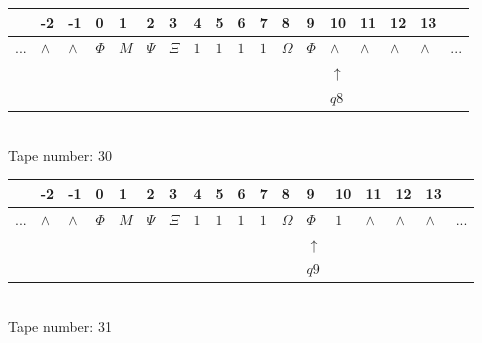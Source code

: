 \documentclass[11pt]{article}
\begin{document}
\begin{table}[H]
\centering
\begin{tabular}{llllllllllllllllll}
 & -2 & -1 & 0 & 1 & 2 & 3 & 4 & 5 & 6 & 7 & 8 & 9 & 10 & 11 & 12 & 13 & \\
\hline
$...$ & \multicolumn{1}{|l|}{$\wedge$} & \multicolumn{1}{|l|}{$\wedge$} & \multicolumn{1}{|l|}{$\Phi$} & \multicolumn{1}{|l|}{$M$} & \multicolumn{1}{|l|}{$\Psi$} & \multicolumn{1}{|l|}{$\Xi$} & \multicolumn{1}{|l|}{$1$} & \multicolumn{1}{|l|}{$1$} & \multicolumn{1}{|l|}{$1$} & \multicolumn{1}{|l|}{$1$} & \multicolumn{1}{|l|}{$\Omega$} & \multicolumn{1}{|l|}{$\Phi$} & \multicolumn{1}{|l|}{$\wedge$} & \multicolumn{1}{|l|}{$\wedge$} & \multicolumn{1}{|l|}{$\wedge$} & \multicolumn{1}{|l|}{$\wedge$} & $...$\\
\hline
&  &  &  &  &  &  &  &  &  &  &  &  & $\uparrow$ &  &  &  &  \\
&  &  &  &  &  &  &  &  &  &  &  &  & $ q8 $ &  &  &  &  \\
\end{tabular}
\\
Tape number: 30
\noindent\makebox[\linewidth]{\hdashrule{\textwidth}{1pt}{1pt}}\end{table}

\begin{table}[H]
\centering
\begin{tabular}{llllllllllllllllll}
 & -2 & -1 & 0 & 1 & 2 & 3 & 4 & 5 & 6 & 7 & 8 & 9 & 10 & 11 & 12 & 13 & \\
\hline
$...$ & \multicolumn{1}{|l|}{$\wedge$} & \multicolumn{1}{|l|}{$\wedge$} & \multicolumn{1}{|l|}{$\Phi$} & \multicolumn{1}{|l|}{$M$} & \multicolumn{1}{|l|}{$\Psi$} & \multicolumn{1}{|l|}{$\Xi$} & \multicolumn{1}{|l|}{$1$} & \multicolumn{1}{|l|}{$1$} & \multicolumn{1}{|l|}{$1$} & \multicolumn{1}{|l|}{$1$} & \multicolumn{1}{|l|}{$\Omega$} & \multicolumn{1}{|l|}{$\Phi$} & \multicolumn{1}{|l|}{$1$} & \multicolumn{1}{|l|}{$\wedge$} & \multicolumn{1}{|l|}{$\wedge$} & \multicolumn{1}{|l|}{$\wedge$} & $...$\\
\hline
&  &  &  &  &  &  &  &  &  &  &  & $\uparrow$ &  &  &  &  &  \\
&  &  &  &  &  &  &  &  &  &  &  & $ q9 $ &  &  &  &  &  \\
\end{tabular}
\\
Tape number: 31
\noindent\makebox[\linewidth]{\hdashrule{\textwidth}{1pt}{1pt}}\end{table}
\end{document}
